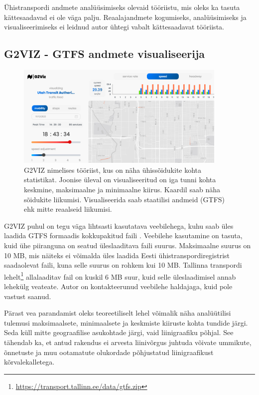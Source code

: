 Ühistranspordi andmete analüüsimiseks olevaid tööriistu, mis oleks ka tasuta kättesaadavad ei ole väga palju. Reaalajandmete kogumiseks, analüüsimiseks ja visualiseerimiseks ei leidnud autor ühtegi vabalt kättesaadavat tööriista.

\subsection{G2VIZ - GTFS andmete visualiseerija}

\begin{figure}[h!]
    \centering
    \includegraphics[width=0.9\textwidth]{figures/g2viz.png}
    \caption{G2VIZ nimelises tööriist, kus on näha ühissõidukite kohta statistikat. Joonise üleval on visualiseeritud on iga tunni kohta keskmine, maksimaalne ja minimaalne kiirus. Kaardil saab näha sõidukite liikumisi. Visualiseerida saab staatilisi andmeid (GTFS) ehk mitte reaalseid liikumisi.}
    \label{fig:sample}
\end{figure}

G2VIZ puhul on tegu väga lihtsasti kasutatava veebilehega, kuhu saab üles laadida GTFS formaadis kokkupakitud faili \cite{2024_pt_g2viz}. Veebilehe kasutamine on tasuta, kuid ühe piiranguna on seatud üleslaaditava faili suurus. Maksimaalne suurus on 10 MB, mis näiteks ei võimalda üles laadida Eesti ühistranspordiregistrist saadaolevat faili, kuna selle suurus on rohkem kui 10 MB. Tallinna transpordi lehelt\footnote{\url{https://transport.tallinn.ee/data/gtfs.zip}} allalaaditav fail on kuskil 6 MB suur, kuid selle üleslaadimisel annab lehekülg veateate. Autor on kontakteerunud veebilehe haldajaga, kuid pole vastust saanud.

Pärast vea parandamist oleks teoreetiliselt lehel võimalik näha analüütilisi tulemusi maksimaalsete, minimaalsete ja keskmiste kiiruste kohta tundide järgi. Seda küll mitte geograafilise asukohtade järgi, vaid liinigraafiku põhjal. See tähendab ka, et antud rakendus ei arvesta liinivõrgus juhtuda võivate ummikute, õnnetuste ja muu ootamatute olukordade põhjustatud liinigraafikust kõrvalekalletega.

